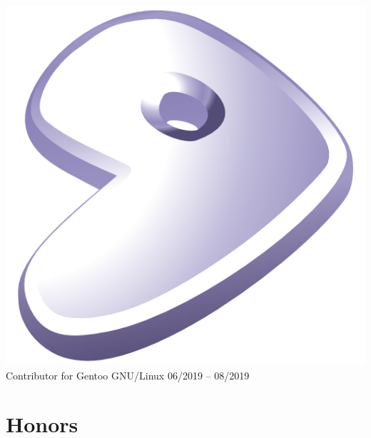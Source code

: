 \documentclass[10pt,margin,line,pifont,palatino,courier]{res}
\begin{document}
\begin{resume}
\begin{itemize}[leftmargin=*]
\begin{itemize}[noitemsep, leftmargin=*]
{            \includegraphics[height=1.2\fontcharht\font`\B]{gentoo-signet.png}
            Contributor} for Gentoo GNU/Linux
            \hfill 06/2019 -- 08/2019
    \end{itemize}
\end{itemize}

%
%
%

\section{\sc Honors}


\end{resume}
\end{document}
